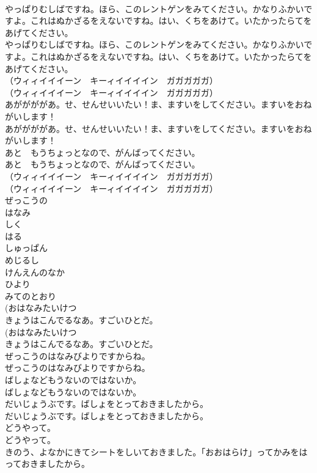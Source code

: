\documentclass[8pt]{extreport}
\begin{document}
\begin{CJK}{UTF8}{min}
\\	やっぱりむしばですね。ほら、このレントゲンをみてください。かなりふかいですよ。これはぬかざるをえないですね。はい、くちをあけて。いたかったらてをあげてください。	
\\	やっぱりむしばですね。ほら、このレントゲンをみてください。かなりふかいですよ。これはぬかざるをえないですね。はい、くちをあけて。いたかったらてをあげてください。 
\\	（ウィィイイイーン　キーィイイイイン　ガガガガガ）	
\\	（ウィィイイイーン　キーィイイイイン　ガガガガガ） 
\\	あががががあ。せ、せんせいいたい！ま、ますいをしてください。ますいをおねがいします！	
\\	あががががあ。せ、せんせいいたい！ま、ますいをしてください。ますいをおねがいします！ 
\\	あと　もうちょっとなので、がんばってください。	
\\	あと　もうちょっとなので、がんばってください。 
\\	（ウィィイイイーン　キーィイイイイン　ガガガガガ）	
\\	（ウィィイイイーン　キーィイイイイン　ガガガガガ） 
\\	ぜっこうの
\\	はなみ
\\	しく
\\	はる
\\	しゅっぱん
\\	めじるし
\\	けんえんのなか
\\	ひより
\\	みてのとおり
\\	(おはなみたいけつ 
\\	きょうはこんでるなあ。すごいひとだ。	
\\	(おはなみたいけつ 
\\	きょうはこんでるなあ。すごいひとだ。 
\\	ぜっこうのはなみびよりですからね。	
\\	ぜっこうのはなみびよりですからね。 
\\	ばしょなどもうないのではないか。	
\\	ばしょなどもうないのではないか。 
\\	だいじょうぶです。ばしょをとっておきましたから。	
\\	だいじょうぶです。ばしょをとっておきましたから。 
\\	どうやって。	
\\	どうやって。 
\\	きのう、よなかにきてシートをしいておきました。「おおはらけ」ってかみをはっておきましたから。	

\end{CJK}
\end{document}
